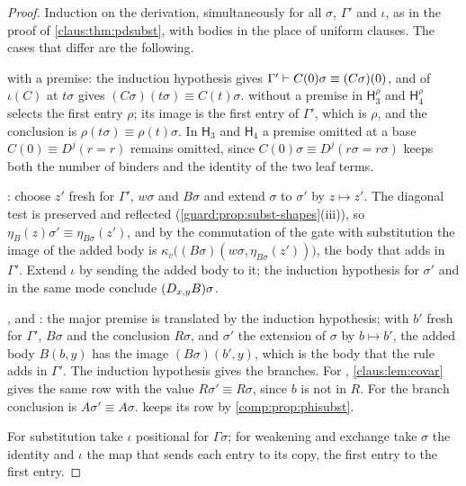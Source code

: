 \begin{proof}
Induction on the derivation, simultaneously for all $\sigma$, $\Gamma'$
and $\iota$, as in the proof of \cref{claus:thm:pdsubst}, with bodies in
the place of uniform clauses. The cases that differ are the following.

 with a premise: the induction hypothesis gives
$\Gamma'\vdash C(0)\sigma\equiv(C\sigma)(0)$, and  of
$\iota(C)$ at $t\sigma$ gives $(C\sigma)(t\sigma)\equiv C(t)\sigma$.
 without a premise in $\mathsf{H}_3^{\rho}$ and
$\mathsf{H}_4^{\rho}$ selects the first entry $\rho$; its image is the first
entry of $\Gamma'$, which is $\rho$, and the conclusion is
$\rho(t\sigma)\equiv\rho(t)\sigma$. In $\mathsf{H}_3$ and $\mathsf{H}_4$ a
premise omitted at a base $C(0)\equiv D^j(r=r)$ remains omitted, since
$C(0)\sigma\equiv D^j(r\sigma=r\sigma)$ keeps both the number of binders
and the identity of the two leaf terms.

: choose $z'$ fresh for $\Gamma'$, $w\sigma$ and $B\sigma$
and extend $\sigma$ to $\sigma'$ by $z\mapsto z'$. The diagonal test is
preserved and reflected (\cref{guard:prop:subst-shapes}(iii)), so
$\eta_B(z)\sigma'\equiv\eta_{B\sigma}(z')$, and by the commutation of the
gate with substitution the image of the added body is
$\kappa_v\bigl((B\sigma)(w\sigma,\eta_{B\sigma}(z'))\bigr)$, the body that
 adds in $\Gamma'$. Extend $\iota$ by sending the added
body to it; the induction hypothesis for $\sigma'$ and  in
the same mode conclude $(D_{x,y}B)\sigma$.

, and : the major premise is translated
by the induction hypothesis; with $b'$ fresh for $\Gamma'$, $B\sigma$ and
the conclusion $R\sigma$, and $\sigma'$ the extension of $\sigma$ by
$b\mapsto b'$, the added body $B(b,y)$ has the image
$(B\sigma)(b',y)$, which is the body that the rule adds in $\Gamma'$. The
induction hypothesis gives the branches. For ,
\cref{claus:lem:covar} gives the same row with the value $R\sigma'\equiv
R\sigma$, since $b$ is not in $R$. For  the branch
conclusion is $A\sigma'\equiv A\sigma$.  keeps its row by
\cref{comp:prop:phisubst}.

For substitution take $\iota$ positional for $\Gamma\sigma$; for weakening
and exchange take $\sigma$ the identity and $\iota$ the map that sends each
entry to its copy, the first entry to the first entry.
\end{proof}

